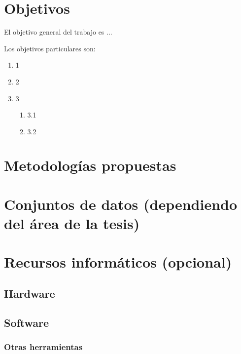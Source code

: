\documentclass[12pt]{article}
\begin{document}
\bigskip

\section{Objetivos}

El objetivo general del trabajo es ...

Los objetivos particulares son:

\begin{enumerate}
    \item 1
    \item 2
    \item 3
          \begin{enumerate}
              \item 3.1
              \item 3.2
          \end{enumerate}
\end{enumerate}

\bigskip

\section{Metodologías propuestas}

\bigskip

\section{Conjuntos de datos (dependiendo del área de la tesis)}

\bigskip

\section{Recursos informáticos (opcional)}

\subsection{Hardware}

\subsection{Software}

\subsubsection{Otras herramientas}

\bigskip
\end{document}
